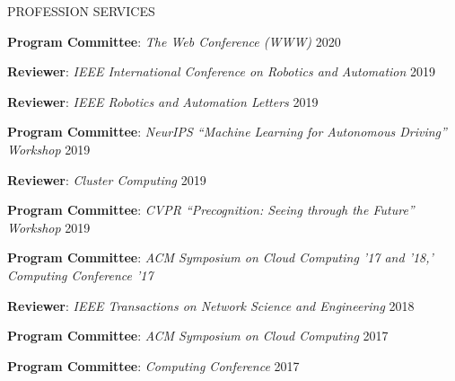 \documentclass{resume} %
\begin{document}
\begin{rSection}{PROFESSION SERVICES}

\small{



\hspace{-1em} \textbf{Program Committee}: \emph{The Web Conference (WWW)} \hfill {2020}

\vspace{-.1in}
\hspace{-1em} \textbf{Reviewer}: \emph{IEEE International Conference on Robotics and Automation} \hfill {2019}

\vspace{-.1in}
\hspace{-1em} \textbf{Reviewer}: \emph{IEEE Robotics and Automation Letters} \hfill {2019}

\vspace{-.1in}
\hspace{-1em} \textbf{Program Committee}: \emph{NeurIPS ``Machine Learning for Autonomous Driving'' Workshop} \hfill {2019}

\vspace{-.1in}
\hspace{-1em} \textbf{Reviewer}: \emph{Cluster Computing} \hfill {2019}

\vspace{-.1in}
\hspace{-1em} \textbf{Program Committee}: \emph{CVPR ``Precognition: Seeing through the Future'' Workshop} \hfill {2019}

\vspace{-.1in}
\hspace{-1em} \textbf{Program Committee}: \emph{ACM Symposium on Cloud Computing '17 and '18,' Computing Conference '17}

\vspace{-.1in}
\hspace{-1em} \textbf{Reviewer}: \emph{IEEE Transactions on Network Science and Engineering} \hfill {2018}

\vspace{-.1in}
\hspace{-1em} \textbf{Program Committee}: \emph{ACM Symposium on Cloud Computing} \hfill {2017}

\vspace{-.1in}
\hspace{-1em} \textbf{Program Committee}: \emph{Computing Conference} \hfill {2017}

}

\end{rSection}
\vspace{-.05in}
\end{document}
